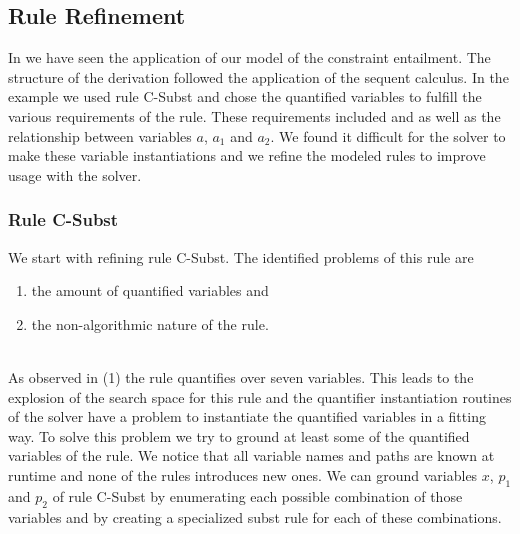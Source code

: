 \subsection{Rule Refinement}
\label{sec:rule-refinement}
In  we have seen the application of our model
of the constraint entailment. The structure of the derivation followed the application
of the sequent calculus.
In the example we used rule C-Subst and chose the quantified variables
to fulfill the various requirements of the rule.
These requirements included  and  as well
as the relationship between variables $a$, $a_1$ and $a_2$.
We found it difficult for the solver to make these variable instantiations
and we refine the modeled rules to improve usage with the solver.

\subsubsection{Rule C-Subst}
We start with refining rule C-Subst.
The identified problems of this rule are
\begin{enumerate}
    \item the amount of quantified variables and
    \item the non-algorithmic nature of the rule.
\end{enumerate}
\quad\\
As observed in (1) the rule quantifies over seven variables.
This leads to the explosion of the search space for this rule
and the quantifier instantiation routines of the solver have a
problem to instantiate the quantified variables in a fitting way.
To solve this problem we try to ground at least some
of the quantified variables of the rule.
We notice that all variable names and paths are known at runtime
and none of the rules introduces new ones.
We can ground variables $x$, $p_1$ and $p_2$ of rule C-Subst
by enumerating each possible combination of those variables
and by creating a specialized subst rule for each of these combinations.

